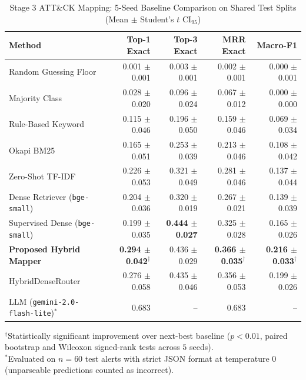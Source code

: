 \begin{table}[t]
\centering
\caption{Stage 3 ATT\&CK Mapping: 5-Seed Baseline Comparison on Shared Test Splits (Mean $\pm$ Student's $t$ CI$_{95}$)}
\label{tab:baselines}
\begin{tabular}{lrrrr}
\toprule
Method & Top-1 Exact & Top-3 Exact & MRR Exact & Macro-F1 \\ \midrule
Random Guessing Floor & 0.001 $\pm$ 0.001 & 0.003 $\pm$ 0.001 & 0.002 $\pm$ 0.001 & 0.000 $\pm$ 0.001 \\
Majority Class & 0.028 $\pm$ 0.020 & 0.096 $\pm$ 0.024 & 0.067 $\pm$ 0.012 & 0.000 $\pm$ 0.000 \\
Rule-Based Keyword & 0.115 $\pm$ 0.046 & 0.196 $\pm$ 0.050 & 0.159 $\pm$ 0.046 & 0.069 $\pm$ 0.034 \\
Okapi BM25 & 0.165 $\pm$ 0.051 & 0.253 $\pm$ 0.039 & 0.213 $\pm$ 0.046 & 0.108 $\pm$ 0.042 \\
Zero-Shot TF-IDF & 0.226 $\pm$ 0.053 & 0.321 $\pm$ 0.049 & 0.281 $\pm$ 0.046 & 0.137 $\pm$ 0.044 \\
Dense Retriever (\texttt{bge-small}) & 0.204 $\pm$ 0.036 & 0.320 $\pm$ 0.019 & 0.267 $\pm$ 0.021 & 0.139 $\pm$ 0.039 \\
Supervised Dense (\texttt{bge-small}) & 0.199 $\pm$ 0.035 & \textbf{0.444 $\pm$ 0.027} & 0.325 $\pm$ 0.028 & 0.165 $\pm$ 0.026 \\
\textbf{Proposed Hybrid Mapper} & \textbf{0.294 $\pm$ 0.042}$^{\dagger}$ & 0.436 $\pm$ 0.029 & \textbf{0.366 $\pm$ 0.035}$^{\dagger}$ & \textbf{0.216 $\pm$ 0.033}$^{\dagger}$ \\
HybridDenseRouter & 0.276 $\pm$ 0.058 & 0.435 $\pm$ 0.046 & 0.356 $\pm$ 0.053 & 0.199 $\pm$ 0.026 \\
\midrule
LLM (\texttt{gemini-2.0-flash-lite})$^{*}$ & 0.683 & -- & 0.683 & -- \\
\bottomrule
\end{tabular}
\begin{flushleft}\footnotesize
$^{\dagger}$Statistically significant improvement over next-best baseline ($p < 0.01$, paired bootstrap and Wilcoxon signed-rank tests across $5$ seeds).\\$^{*}$Evaluated on $n=60$ test alerts with strict JSON format at temperature 0 (unparseable predictions counted as incorrect).
\end{flushleft}
\end{table}